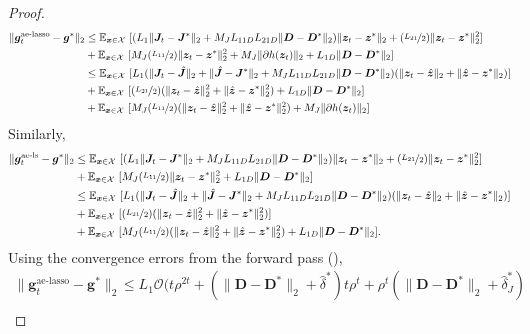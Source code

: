 \documentclass[10pt]{article} %
\newcommand{\E}{\mathbb{E}} %
\newcommand{\D}{{\bm D}}
\newcommand{\J}{{\bm J}}
\newcommand{\x}{{\bm x}}
\newcommand{\z}{{\bm z}}
\newcommand{\g}{{\bm g}}
\newcommand{\X}{\mathcal{X}}
\begin{document}
\begin{proof}
\begin{equation}
\begin{aligned}
\| \g_t^{\text{ae-lasso}} - \g^{\ast}  \|_2 &\leq \E_{\x \in \X}\ [ (L_1 \| \J_t - \J^{\ast} \|_2 + M_J L_{11D} L_{21D} \| \D - \D^{\ast} \|_2) \| \z_t - \z^{\ast} \|_2 + (\nicefrac{L_{21}}{2}) \| \z_t - \z^{\ast} \|_2^2]\\
& + \E_{\x \in \X}\ [ M_J (\nicefrac{L_{11}}{2}) \| \z_t - \z^{\ast} \|_2^2 + M_J \| \partial h(\z_t) \|_2 + L_{1D} \| \D - \D^{\ast}\|_2]\\
&\leq \E_{\x \in \X}\ [ L_1(\| \J_t - \hat \J \|_2 +  \| \hat \J - \J^{\ast} \|_2 + M_J L_{11D} L_{21D} \| \D - \D^{\ast} \|_2) (\| \z_t - \hat \z \|_2 + \| \hat \z - \z^{\ast} \|_2)]\\
& + \E_{\x \in \X}\ [(\nicefrac{L_{21}}{2}) (\| \z_t - \hat \z \|_2^2 + \| \hat \z - \z^{\ast} \|_2^2) + L_{1D} \| \D - \D^{\ast}\|_2]\\
& + \E_{\x \in \X}\ [ M_J (\nicefrac{L_{11}}{2}) (\| \z_t - \hat \z \|_2^2 +  \| \hat \z - \z^{\ast} \|_2^2 ) + M_J \| \partial h(\z_t) \|_2]
\end{aligned}
\end{equation}
Similarly,
\begin{equation}
\begin{aligned}
\| \g_t^{\text{ae-ls}} - \g^{\ast}   \|_2 &\leq \E_{\x \in \X}\ [ (L_1 \| \J_t - \J^{\ast}  \|_2 + M_J L_{11D} L_{21D} \| \D - \D^{\ast} \|_2 )\| \z_t - \z^{\ast}  \|_2 + (\nicefrac{L_{21}}{2}) \| \z_t - \z^{\ast}  \|_2^2]\\
& + \E_{\x \in \X}\ [ M_J (\nicefrac{L_{11}}{2}) \| \z_t - \z^{\ast}  \|_2^2 + L_{1D} \| \D - \D^{\ast} \|_2]\\
&\leq \E_{\x \in \X}\ [ L_1(\| \J_t - \hat \J \|_2 +  \| \hat \J - \J^{\ast} \|_2 + M_J L_{11D} L_{21D} \| \D - \D^{\ast} \|_2) (\| \z_t - \hat \z \|_2 + \| \hat \z - \z^{\ast}  \|_2)]\\
& + \E_{\x \in \X}\ [(\nicefrac{L_{21}}{2}) (\| \z_t - \hat \z \|_2^2 + \| \hat \z - \z^{\ast}  \|_2^2)]\\
& + \E_{\x \in \X}\ [ M_J (\nicefrac{L_{11}}{2}) (\| \z_t - \hat \z \|_2^2 +  \| \hat \z - \z^{\ast}  \|_2^2) + L_{1D} \| \D - \D^{\ast} \|_2].
\end{aligned}
\end{equation}
Using the convergence errors from the forward pass (),
%
\begin{equation}
\begin{aligned}
\| \g_t^{\text{ae-lasso}} - \g^{\ast}  \|_2 &\leq L_1 \mathcal{O}(t \rho^{2t} + ( \|  \D - \D^{\ast} \|_2 + \hat \delta^{\ast})  t\rho^{t} + \rho^t (\|  \D - \D^{\ast} \|_2 + \hat \delta_J^{\ast})\\

\end{aligned}
\end{equation}
\end{proof}
\end{document}
